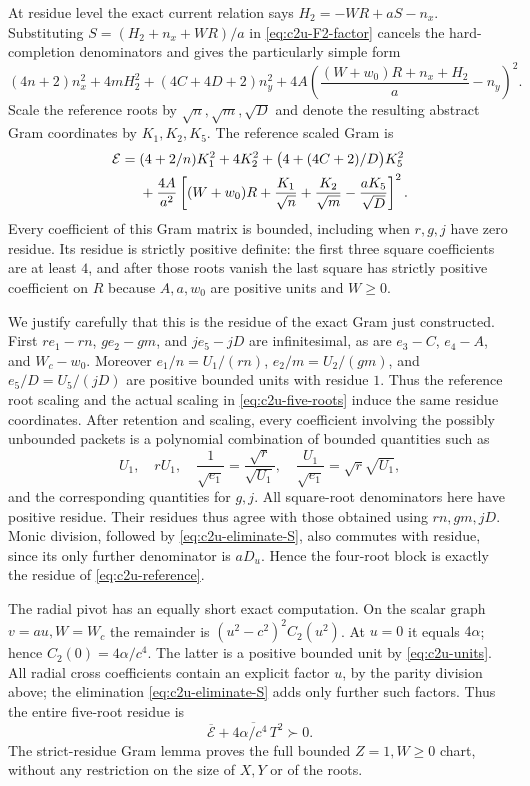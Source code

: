 At residue level the exact current relation says
$H_2=-WR+aS-n_x$.  Substituting
$S=(H_2+n_x+WR)/a$ in \eqref{eq:c2u-F2-factor} cancels the
hard-completion denominators and gives the particularly simple form
\begin{equation}
(4n+2)n_x^2+4mH_2^2+(4C+4D+2)n_y^2
 +4A\left(\frac{(W+w_0)R+n_x+H_2}{a}-n_y\right)^2.
\label{eq:c2u-pre-scaled}
\end{equation}
Scale the reference roots by $\sqrt n,\sqrt m,\sqrt D$ and denote
the resulting abstract Gram coordinates by $K_1,K_2,K_5$.  The reference
scaled Gram is
\begin{align}
\mathcal E={}&(4+2/n)K_1^2+4K_2^2
 +\bigl(4+(4C+2)/D\bigr)K_5^2\notag\\
&+\frac{4A}{a^2}\left[
(W+w_0)R+\frac{K_1}{\sqrt n}+\frac{K_2}{\sqrt m}
-\frac{aK_5}{\sqrt D}\right]^2.
\label{eq:c2u-reference}
\end{align}
Every coefficient of this Gram matrix is bounded, including when
$r,g,j$ have zero residue.  Its residue is strictly positive definite:
the first three square coefficients are at least $4$, and after those
roots vanish the last square has strictly positive coefficient on $R$
because $A,a,w_0$ are positive units and $W\geq0$.

We justify carefully that this is the residue of the exact Gram just
constructed.  First $re_1-rn$, $ge_2-gm$, and $je_5-jD$ are
infinitesimal, as are $e_3-C$, $e_4-A$, and $W_c-w_0$.
Moreover $e_1/n=U_1/(rn)$, $e_2/m=U_2/(gm)$, and
$e_5/D=U_5/(jD)$ are positive bounded units with residue $1$.
Thus the reference root scaling and the actual scaling in
\eqref{eq:c2u-five-roots} induce the same residue coordinates.
After retention and scaling, every coefficient involving the possibly
unbounded packets is a polynomial combination of bounded quantities
such as
\[
U_1,\quad rU_1,\quad \frac1{\sqrt{e_1}}=
\frac{\sqrt r}{\sqrt{U_1}},\quad
\frac{U_1}{\sqrt{e_1}}=\sqrt r\sqrt{U_1},
\]
and the corresponding quantities for $g,j$.  All square-root
denominators here have positive residue.  Their residues thus agree
with those obtained using $rn,gm,jD$.  Monic division, followed by
\eqref{eq:c2u-eliminate-S}, also commutes with residue, since its
only further denominator is $aD_u$.  Hence the four-root block is
exactly the residue of \eqref{eq:c2u-reference}.

The radial pivot has an equally short exact computation.  On the scalar
graph $v=au,W=W_c$ the remainder is
$(u^2-c^2)^2C_2(u^2)$.  At $u=0$ it equals $4\alpha$; hence
$C_2(0)=4\alpha/c^4$.  The latter is a positive bounded unit by
\eqref{eq:c2u-units}.  All radial cross coefficients contain
an explicit factor $u$, by the parity division above; the elimination
\eqref{eq:c2u-eliminate-S} adds only further such factors.
Thus the entire five-root residue is
\begin{equation}
\overline{\mathcal E}
 +4\overline{\alpha/c^4}\,T^2\succ0.
\label{eq:c2u-strict-residue}
\end{equation}
The strict-residue Gram lemma proves the full bounded $Z=1,W\geq0$
chart, without any restriction on the size of $X,Y$ or of the roots.

